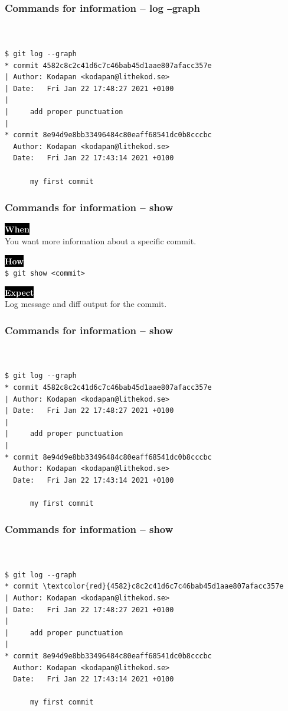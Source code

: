 \documentclass{beamer}
\newcommand{\keyword}[1]{\hspace{-1.0em}\colorbox{black}{\textcolor{white}{\textbf{#1}\vphantom{Ep}}}\vspace{0.2em}} %
\begin{document}
\begin{frame}[fragile]
  \frametitle{Commands for information -- log \texttt{--}graph}
\begin{Verbatim}[commandchars=\\\{\}]


$ git log --graph
* commit 4582c8c2c41d6c7c46bab45d1aae807afacc357e
| Author: Kodapan <kodapan@lithekod.se>
| Date:   Fri Jan 22 17:48:27 2021 +0100
| 
|     add proper punctuation
| 
* commit 8e94d9e8bb33496484c80eaff68541dc0b8cccbc
  Author: Kodapan <kodapan@lithekod.se>
  Date:   Fri Jan 22 17:43:14 2021 +0100
  
      my first commit
\end{Verbatim}
\end{frame}

\begin{frame}
  \frametitle{Commands for information -- show}

  \keyword{When}\\
  You want more information about a specific commit.
  \vspace{0.5em}

  \keyword{How}\\
  \texttt{\$ git show <commit>}
  \vspace{0.5em}

  \keyword{Expect}\\
  Log message and diff output for the commit.
\end{frame}

\begin{frame}[fragile]
  \frametitle{Commands for information -- show}
\begin{Verbatim}[commandchars=\\\{\}]


$ git log --graph
* commit 4582c8c2c41d6c7c46bab45d1aae807afacc357e
| Author: Kodapan <kodapan@lithekod.se>
| Date:   Fri Jan 22 17:48:27 2021 +0100
| 
|     add proper punctuation
| 
* commit 8e94d9e8bb33496484c80eaff68541dc0b8cccbc
  Author: Kodapan <kodapan@lithekod.se>
  Date:   Fri Jan 22 17:43:14 2021 +0100
  
      my first commit
\end{Verbatim}
\end{frame}

\begin{frame}[fragile]
  \frametitle{Commands for information -- show}
\begin{Verbatim}[commandchars=\\\{\}]


$ git log --graph
* commit \textcolor{red}{4582}c8c2c41d6c7c46bab45d1aae807afacc357e
| Author: Kodapan <kodapan@lithekod.se>
| Date:   Fri Jan 22 17:48:27 2021 +0100
| 
|     add proper punctuation
| 
* commit 8e94d9e8bb33496484c80eaff68541dc0b8cccbc
  Author: Kodapan <kodapan@lithekod.se>
  Date:   Fri Jan 22 17:43:14 2021 +0100
  
      my first commit
\end{Verbatim}
\end{frame}
\end{document}
